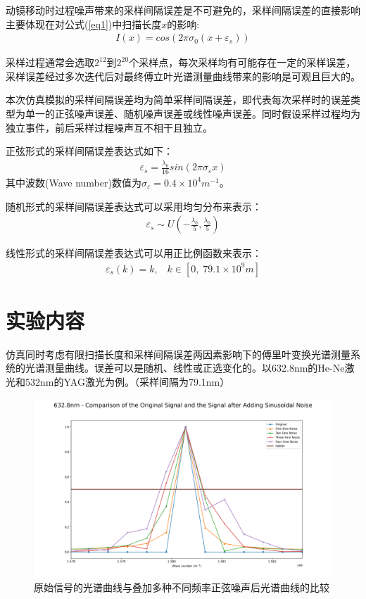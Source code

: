 \documentclass[conference]{IEEEtran}
\begin{document}
动镜移动时过程噪声带来的采样间隔误差是不可避免的，采样间隔误差的直接影响主要体现在对公式(\ref{eq1})中扫描长度$x$的影响:
\begin{align}
    I(x) = cos(2\pi\sigma_0(x + \varepsilon_s)) \label{eq9}
\end{align}

采样过程通常会选取$2^{12}$到$2^{20}$个采样点，每次采样均有可能存在一定的采样误差，采样误差经过多次迭代后对最终傅立叶光谱测量曲线带来的影响是可观且巨大的。

本次仿真模拟的采样间隔误差均为简单采样间隔误差，即代表每次采样时的误差类型为单一的正弦噪声误差、随机噪声误差或线性噪声误差。同时假设采样过程均为独立事件，前后采样过程噪声互不相干且独立。

正弦形式的采样间隔误差表达式如下：
\begin{align}
    \varepsilon_s = \frac{\lambda_0}{16}sin(2\pi\sigma_{\varepsilon}x)  \label{eq2}
\end{align}
其中波数(Wave number)数值为$\sigma_{\varepsilon} = 0.4\times10^4 m^{-1}$。

随机形式的采样间隔误差表达式可以采用均匀分布来表示：
\begin{align}
    \varepsilon_s \sim U(-\frac{\lambda_0}{5}, \frac{\lambda_0}{5})   \label{eq3}
\end{align}

线性形式的采样间隔误差表达式可以用正比例函数来表示：
\begin{align}
    \varepsilon_s(k) = k, \;\;\; k \in [0, \;79.1\times10^9 m] \label{eq4}
\end{align}

\section{实验内容}
仿真同时考虑有限扫描长度和采样间隔误差两因素影响下的傅里叶变换光谱测量系统的光谱测量曲线。误差可以是随机、线性或正选变化的。以632.8nm的He-Ne激光和532nm的YAG激光为例。（采样间隔为79.1nm）

\begin{figure}[htbp]
	\centerline{
		\includegraphics[width=22cm]{所有波放一起.png} 	
	}
	\caption{原始信号的光谱曲线与叠加多种不同频率正弦噪声后光谱曲线的比较}
	\label{pic7}
\end{figure}
\end{document}
